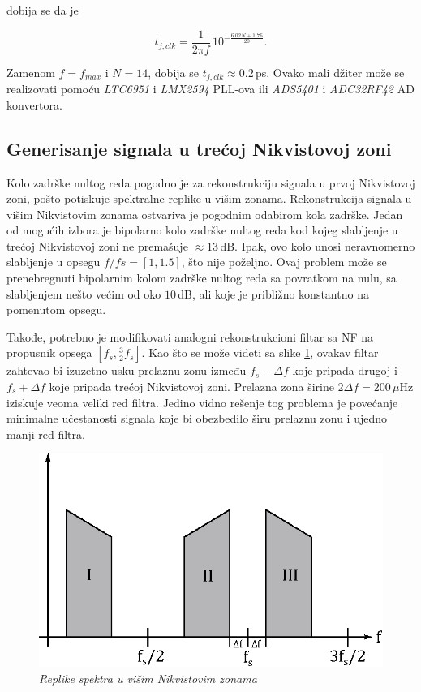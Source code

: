 \documentclass[conference]{IEEEtran}
\begin{document}
\noindent dobija se da je 

\begin{equation}
t_{j,clk} = \frac{1}{2\pi f}\,10^{-\frac{6.02N + 1.76}{20}}  .
\end{equation}

Zamenom $f=f_{max}$ i $N=14$, dobija se $t_{j,clk}\approx 0.2$\,ps. Ovako mali džiter može se realizovati pomoću \textsl{LTC6951} i \textsl{LMX2594} PLL-ova ili \textsl{ADS5401} i \textsl{ADC32RF42} AD konvertora. 

\subsection{Generisanje signala u trećoj Nikvistovoj zoni}
Kolo zadrške nultog reda pogodno je za rekonstrukciju signala u prvoj Nikvistovoj zoni, pošto potiskuje spektralne replike u višim zonama. Rekonstrukcija signala u višim Nikvistovim zonama ostvariva je pogodnim odabirom kola zadrške. Jedan od mogućih izbora je bipolarno kolo zadrške nultog reda kod kojeg slabljenje u trećoj Nikvistovoj zoni ne premašuje $\approx 13$\,dB. Ipak, ovo kolo unosi neravnomerno slabljenje u opsegu $f/fs = [1, 1.5]$, što nije poželjno. Ovaj problem može se prenebregnuti bipolarnim kolom zadrške nultog reda sa povratkom na nulu, sa slabljenjem nešto većim od oko $10$\,dB, ali koje je približno konstantno na pomenutom opsegu.

Takođe, potrebno je modifikovati analogni rekonstrukcioni filtar sa NF na propusnik opsega $[f_s, \frac{3}{2}f_s]$. Kao što se može videti sa slike \ref{slika:nikvist}, ovakav filtar zahtevao bi izuzetno usku prelaznu zonu između $f_s-\Delta f$ koje pripada drugoj i $f_s+\Delta f$ koje pripada trećoj Nikvistovoj zoni. Prelazna zona širine $2\Delta f = 200\,\mu$Hz iziskuje veoma veliki red filtra. Jedino vidno rešenje tog problema je povećanje minimalne učestanosti signala koje bi obezbedilo širu prelaznu zonu i ujedno manji red filtra.

\begin{figure}[h]
	\centering
	\includegraphics[scale=0.7]{./slike/nikvist.eps}
	\caption{\textsl{Replike spektra u višim Nikvistovim zonama}}
	\label{slika:nikvist}
\end{figure}
\end{document}
